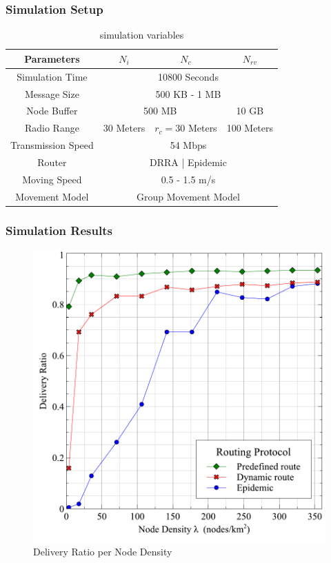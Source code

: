 \documentclass{beamer}
\begin{document}
\begin{frame}
	\frametitle{Simulation Setup}
\begin{table}[!t]
	\renewcommand{\arraystretch}{1.3}
	\caption{simulation variables}
	\label{table_parameters}
	\centering
	\begin{tabular}{|c|c|c|c|}
		\hline
		Parameters         & $N_{i}$ & $N_{c}$ & $N_{rv}$ \\ \hline
		Simulation Time     & \multicolumn{3}{|c|}{10800 Seconds }  \\ \hline
		Message Size       &  \multicolumn{3}{|c|}{500 KB - 1 MB}        \\ \hline
		Node Buffer         & \multicolumn{2}{|c|}{500 MB}&  10 GB      \\ \hline
		Radio Range & 30 Meters &  $r_{c} = 30$ Meters  & 100 Meters \\ \hline
		Transmission Speed &  \multicolumn{3}{|c|}{ 54 Mbps   }        \\ \hline
		Router             & \multicolumn{3}{|c|}{ DRRA | Epidemic   } \\ \hline
		Moving Speed       &   \multicolumn{3}{|c|}{0.5 - 1.5 m/s }        \\ \hline
		Movement Model     &   \multicolumn{3}{|c|}{Group Movement Model  }      \\ \hline
	\end{tabular}
\end{table}
\end{frame}
\begin{frame}
	\frametitle{Simulation Results}
\begin{figure}
\centering
\includegraphics[width=0.6\linewidth]{Figures_Present/DeliveryRatio}
\caption{Delivery Ratio per Node Density}
\label{fig:DeliveryRatio}
\end{figure}
\end{frame}
\end{document}
